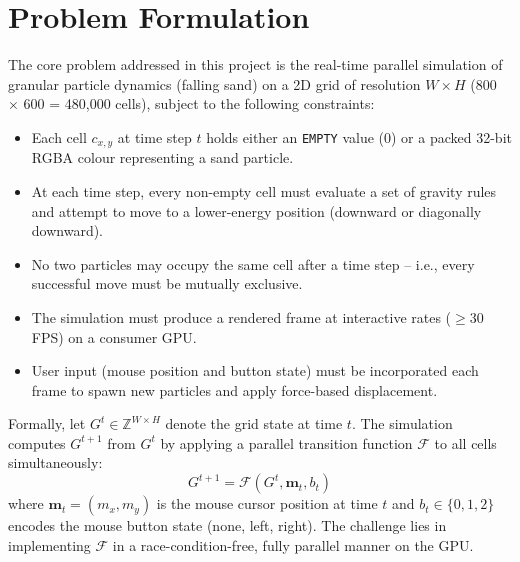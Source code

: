 \documentclass[12pt,a4paper]{article}
\begin{document}
	\newpage
	\section{Problem Formulation}
    The core problem addressed in this project is the real-time parallel simulation of granular particle 
    dynamics (falling sand) on a 2D grid of resolution $W \times H$ (800 $\times$ 600 = 480,000 cells), 
    subject to the following constraints:

    \begin{itemize}
        \item Each cell $c_{x,y}$ at time step $t$ holds either an \texttt{EMPTY} value (0) or a 
        packed 32-bit RGBA colour representing a sand particle.
        \item At each time step, every non-empty cell must evaluate a set of gravity rules and 
        attempt to move to a lower-energy position (downward or diagonally downward).
        \item No two particles may occupy the same cell after a time step -- i.e., every successful 
        move must be mutually exclusive.
        \item The simulation must produce a rendered frame at interactive rates ($\geq$30 FPS) on 
        a consumer GPU.
        \item User input (mouse position and button state) must be incorporated each frame to spawn 
        new particles and apply force-based displacement.
    \end{itemize}

    Formally, let $G^t \in \mathbb{Z}^{W \times H}$ denote the grid state at time $t$. The simulation 
    computes $G^{t+1}$ from $G^t$ by applying a parallel transition function $\mathcal{F}$ to all 
    cells simultaneously:
    \[
        G^{t+1} = \mathcal{F}(G^t, \mathbf{m}_t, b_t)
    \]
    where $\mathbf{m}_t = (m_x, m_y)$ is the mouse cursor position at time $t$ and $b_t \in \{0,1,2\}$ 
    encodes the mouse button state (none, left, right). The challenge lies in implementing $\mathcal{F}$ 
    in a race-condition-free, fully parallel manner on the GPU.
\end{document}
